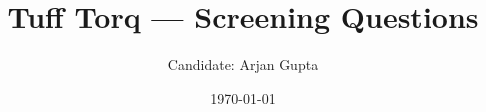 \documentclass{article}
\begin{document}
\title{Tuff Torq --- Screening Questions}
\author{Candidate: Arjan Gupta}
\date{\today}
\maketitle




 


\end{document}
